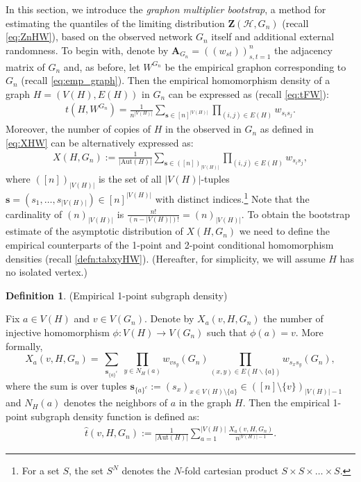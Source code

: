 \documentclass[11pt,reqno]{amsart}
\numberwithin{equation}{section}
\newcommand{\cH}{{\mathcal H}}
\newcommand\Aut{\mathrm{Aut}}
\theoremstyle{definition}
\newtheorem{definition}{Definition}[section]
\begin{document}
In this section, we introduce the {\it graphon multiplier bootstrap}, a method for estimating the quantiles of the limiting distribution $\bm{Z}(\cH, G_n)$ (recall \eqref{eq:ZnHW}), based on the observed network $G_n$ itself and additional external randomness. To begin with,
denote by $\bm A_{G_n} = ((w_{st}))_{s,t = 1}^{n}$ the adjacency matrix of $G_n$ and, as before, let $W^{G_n}$ be the empirical graphon corresponding to $G_n$ (recall \eqref{eq:emp_graph}).    
Then the empirical homomorphism density of a graph $H = (V(H), E(H))$ in $G_n$
can be expressed as (recall \eqref{eq:tFW}):  
\begin{align}\label{eq:tHWGn}
    t(H, W^{G_n})=\frac{1}{n^{|V(H)|}}\sum_{\bm s\in [n]^{|V(H)|}} \prod_{(i,j)\in E(H)} w_{s_is_j}.
\end{align}
Moreover, the number of copies of $H$ in the observed in $G_n$ as defined in \eqref{eq:XHW} can be alternatively expressed as: 
\begin{align}\label{eq:XHWGn}
X(H, G_n):=\frac{1}{|\mathrm{Aut}(H)|}\sum_{\bm s\in ([n])_{|V(H)|}} \prod_{(i,j)\in E(H)} w_{s_is_j} ,
\end{align}
where $([n])_{|V(H)|}$ is the set of all $|V(H)|$-tuples ${\bm s}=(s_1,\ldots, s_{|V(H)|})\in  [n]^{|V(H)|}$ with distinct indices.\footnote{For a set $S$, the set $S^N$ denotes the $N$-fold cartesian product $S\times S \times \ldots \times S$.} Note that the cardinality of $(n)_{|V(H)|}$ is $\frac{n!}{(n-|V(H)|)!} = (n)_{|V(H)|}$. To obtain the bootstrap estimate of the asymptotic distribution of $X(H, G_n)$ we need to define the empirical counterparts of the 
1-point and 2-point conditional homomorphism densities (recall \eqref{defn:tabxyHW}). (Hereafter, for simplicity, we will assume $H$ has no isolated vertex.)



\begin{definition}\label{def:Xav} (Empirical 1-point subgraph density) 

Fix $a \in V(H)$ and $v \in V(G_n)$. Denote by $X_a(v, H, G_n)$  the number of injective homomorphism $\phi: V(H) \rightarrow V(G_n)$ such that $\phi(a)=v$. More formally, 
$$X_a(v, H, G_n)= \sum_{\substack{\bm s_{\{a\}^c}}} \prod_{y \in N_H(a)} w_{ v s_y}(G_n) \prod_{(x, y) \in E(H\backslash \{a\})} w_{s_x s_y}(G_n),$$ 
where the sum is over tuples $\bm s_{\{a\}^c} := (s_x)_{x\in V(H)\setminus \{a\} } \in ([n]\setminus \{v\})_{|V(H)|-1}$ and $N_H(a)$ denotes the neighbors of $a$ in the graph $H$. Then the empirical 1-point  subgraph density function is defined as: 
\begin{align}\label{eq:tHGnestimate}
\hat t(v, H, G_n) := \frac{1}{|\Aut(H)|} \sum_{a=1}^{|V(H)|} \frac{X_a(v, H, G_n)}{n^{|V(H)| -1 }} . 
\end{align}
\end{definition} 
\end{document}
